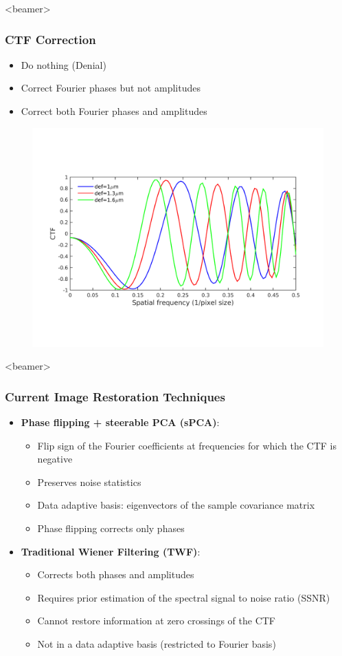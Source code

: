 \documentclass{beamer}
\begin{document}
\begin{frame}<beamer>
\frametitle{CTF Correction}

\begin{itemize}
\item Do nothing (Denial) 
\item Correct Fourier phases but not amplitudes
\item Correct both Fourier phases and amplitudes 
\end{itemize}
\begin{figure}[]
 \includegraphics[scale=0.4]{ctfeg_fig.png}
 \end{figure}
\end{frame}

\begin{frame}<beamer>
\frametitle{Current Image Restoration Techniques}
\begin{itemize}
 \item \textbf{Phase flipping + steerable PCA (sPCA)}: 
  \begin{itemize}
  \item  Flip sign of the Fourier
coefficients at frequencies for which the CTF is negative
   \item Preserves noise statistics
   \item Data adaptive basis: eigenvectors of the sample covariance matrix
   \item Phase flipping corrects only phases
  \end{itemize}
 \item \textbf{Traditional Wiener Filtering (TWF)}:
 \begin{itemize}
  \item  Corrects both phases and amplitudes
  \item Requires prior estimation of the spectral signal to
 noise ratio (SSNR)
  \item  Cannot restore information at zero crossings of the CTF
  \item Not in a data adaptive basis (restricted to Fourier basis)
 \end{itemize}
\end{itemize}
\end{frame}
\end{document}
